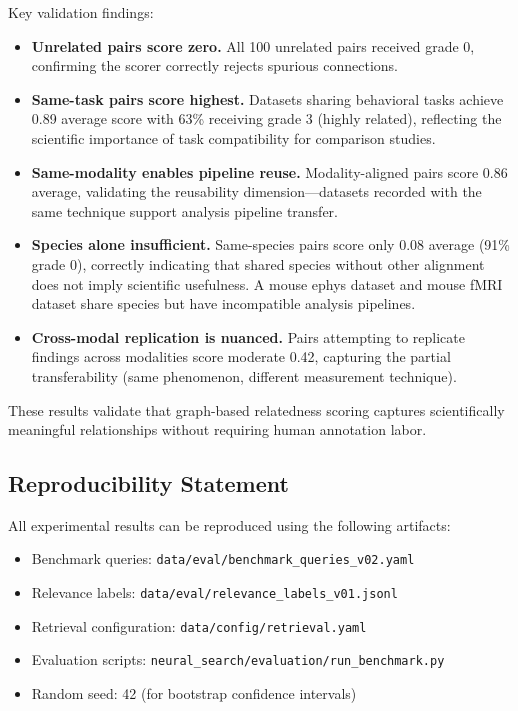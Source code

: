 \documentclass{article}
\theoremstyle{definition}
\begin{document}
Key validation findings:
\begin{itemize}
    \item \textbf{Unrelated pairs score zero.} All 100 unrelated pairs received grade 0, confirming the scorer correctly rejects spurious connections.

    \item \textbf{Same-task pairs score highest.} Datasets sharing behavioral tasks achieve 0.89 average score with 63\% receiving grade 3 (highly related), reflecting the scientific importance of task compatibility for comparison studies.

    \item \textbf{Same-modality enables pipeline reuse.} Modality-aligned pairs score 0.86 average, validating the reusability dimension---datasets recorded with the same technique support analysis pipeline transfer.

    \item \textbf{Species alone insufficient.} Same-species pairs score only 0.08 average (91\% grade 0), correctly indicating that shared species without other alignment does not imply scientific usefulness. A mouse ephys dataset and mouse fMRI dataset share species but have incompatible analysis pipelines.

    \item \textbf{Cross-modal replication is nuanced.} Pairs attempting to replicate findings across modalities score moderate 0.42, capturing the partial transferability (same phenomenon, different measurement technique).
\end{itemize}

These results validate that graph-based relatedness scoring captures scientifically meaningful relationships without requiring human annotation labor.

\subsection{Reproducibility Statement}

All experimental results can be reproduced using the following artifacts:

\begin{itemize}
    \item Benchmark queries: \texttt{data/eval/benchmark\_queries\_v02.yaml}
    \item Relevance labels: \texttt{data/eval/relevance\_labels\_v01.jsonl}
    \item Retrieval configuration: \texttt{data/config/retrieval.yaml}
    \item Evaluation scripts: \texttt{neural\_search/evaluation/run\_benchmark.py}
    \item Random seed: 42 (for bootstrap confidence intervals)
\end{itemize}
\end{document}

